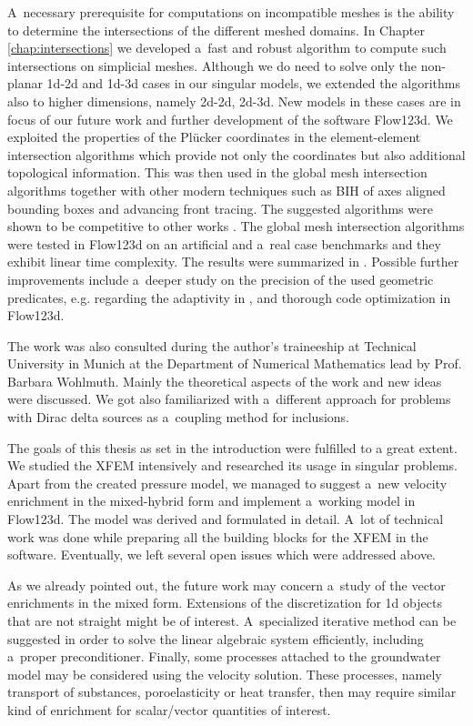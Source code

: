 \documentclass[bibliography=totocnumbered,dvipsnames,FM,Dis, EN]{tulthesis_autoreferat}
\newcommand{\plucker}{Pl\"{u}cker }
\begin{document}
A~necessary prerequisite for computations on incompatible meshes is the ability to determine
the intersections of the different meshed domains. In Chapter \ref{chap:intersections} we developed
a~fast and robust algorithm to compute such intersections on simplicial meshes.
Although we do need to solve only the non-planar 1d-2d and 1d-3d cases in our singular models,
we extended the algorithms also to higher dimensions, namely 2d-2d, 2d-3d.
New models in these cases are in focus of our future work and further development of the software Flow123d.
We exploited the properties of the \plucker coordinates \cite{platis_fast_2003, joswig_plucker_2013}
in the element-element intersection algorithms which provide not only the coordinates but also additional topological information.
This was then used in the global mesh intersection algorithms together with other modern techniques
such as BIH of axes aligned bounding boxes and advancing front tracing.
The suggested algorithms were shown to be competitive to other works \cite{moller_fast_1997, haines_fast_1991}.
The global mesh intersection algorithms were tested in Flow123d on an artificial and a~real case benchmarks
and they exhibit linear time complexity. The results were summarized in \cite{brezina_2017}.
Possible further improvements include a~deeper study on the precision of the used geometric predicates,
e.g. regarding the adaptivity in \cite{shewchuk_adaptive_1997}, and thorough code optimization in Flow123d.


The work was also consulted during the author's traineeship at Technical University in Munich at the Department of Numerical Mathematics
lead by Prof. Barbara Wohlmuth. Mainly the theoretical aspects of the work and new ideas were discussed.
We got also familiarized with a~different approach for problems with Dirac delta sources \cite{koppl_tum_2015, koppl_vidotto_2018}
as a~coupling method for inclusions.


The goals of this thesis as set in the introduction were fulfilled to a great extent.
We studied the XFEM intensively and researched its usage in singular problems.
Apart from the created pressure model, we managed to suggest a~new velocity enrichment in the mixed-hybrid form
and implement a~working model in Flow123d. The model was derived and formulated in detail.
A~lot of technical work was done while preparing all the building blocks for the XFEM in the software.
Eventually, we left several open issues which were addressed above.

As we already pointed out, the future work may concern a~study of the vector enrichments in the mixed form.
Extensions of the discretization for 1d objects that are not straight might be of interest.
A~specialized iterative method can be suggested in order to solve the linear algebraic system efficiently,
including a~proper preconditioner.
Finally, some processes attached to the groundwater model may be considered using the velocity solution.
These processes, namely transport of substances, poroelasticity or heat transfer, then may require
similar kind of enrichment for scalar/vector quantities of interest. 
\end{document}
